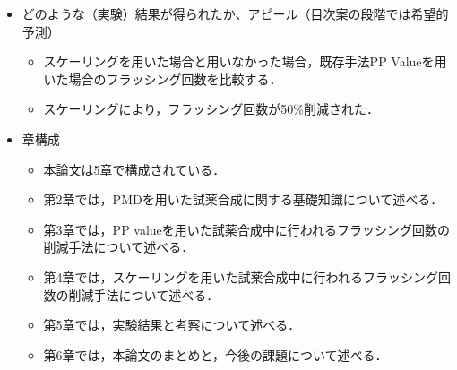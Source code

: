 \begin{itemize}
\begin{itemize}
    \end{itemize}
 \item どのような（実験）結果が得られたか、アピール（目次案の段階では希望的予測）
    \begin{itemize}
        \item スケーリングを用いた場合と用いなかった場合，既存手法PP Valueを用いた場合のフラッシング回数を比較する．
        \item スケーリングにより，フラッシング回数が50\%削減された．
    \end{itemize}
\item 章構成
    \begin{itemize}
        \item 本論文は5章で構成されている．
        \item 第2章では，PMDを用いた試薬合成に関する基礎知識について述べる．
        \item 第3章では，PP valueを用いた試薬合成中に行われるフラッシング回数の削減手法について述べる．
        \item 第4章では，スケーリングを用いた試薬合成中に行われるフラッシング回数の削減手法について述べる．
        \item 第5章では，実験結果と考察について述べる．
        \item 第6章では，本論文のまとめと，今後の課題について述べる．
    \end{itemize}
\end{itemize}

